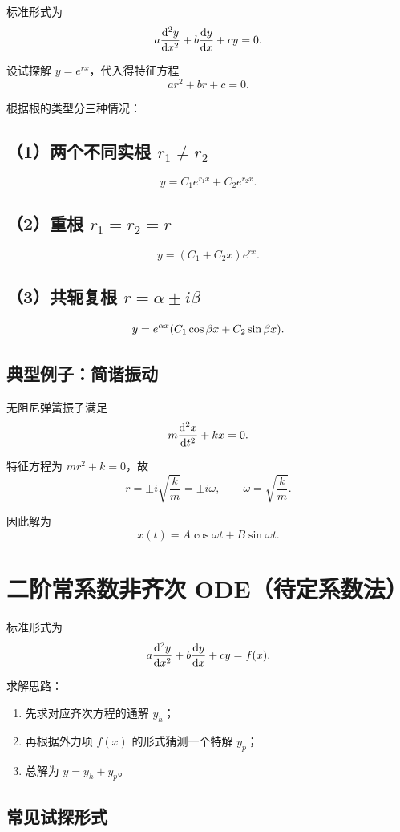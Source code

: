 标准形式为
\[
 a\dv[2]{y}{x}+b\dv{y}{x}+cy=0.
\]

设试探解 $y=e^{rx}$，代入得特征方程
\[
 ar^2+br+c=0.
\]

根据根的类型分三种情况：

\subsection*{（1）两个不同实根 $r_1\neq r_2$}
\[
 y=C_1 e^{r_1 x}+C_2 e^{r_2 x}.
\]

\subsection*{（2）重根 $r_1=r_2=r$}
\[
 y=(C_1+C_2 x)e^{rx}.
\]

\subsection*{（3）共轭复根 $r=\alpha\pm i\beta$}
\[
 y=e^{\alpha x}\qty(C_1\cos\beta x+C_2\sin\beta x).
\]

\subsection*{典型例子：简谐振动}

无阻尼弹簧振子满足
\[
 m\dv[2]{x}{t}+kx=0.
\]

特征方程为 $mr^2+k=0$，故
\[
 r=\pm i\sqrt{\frac{k}{m}}=\pm i\omega,
\qquad
\omega=\sqrt{\frac{k}{m}}.
\]

因此解为
\[
 x(t)=A\cos \omega t+B\sin \omega t.
\]

\section{二阶常系数非齐次 ODE（待定系数法）}

标准形式为
\[
 a\dv[2]{y}{x}+b\dv{y}{x}+cy=f(x).
\]

求解思路：
\begin{enumerate}
  \item 先求对应齐次方程的通解 $y_h$；
  \item 再根据外力项 $f(x)$ 的形式猜测一个特解 $y_p$；
  \item 总解为 $y=y_h+y_p$。
\end{enumerate}

\subsection*{常见试探形式}

